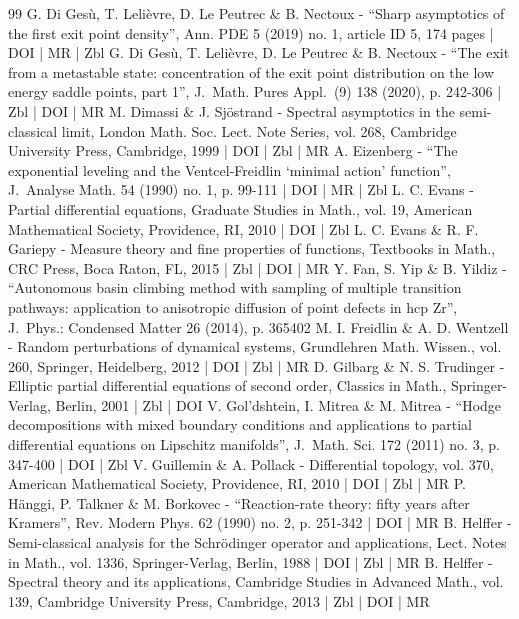 \begin{thebibliography}{99}
G. Di Gesù, T. Lelièvre, D. Le Peutrec \& B. Nectoux - “Sharp asymptotics of the first exit point density”, Ann. PDE 5 (2019) no. 1, article ID 5, 174 pages | DOI | MR | Zbl
G. Di Gesù, T. Lelièvre, D. Le Peutrec \& B. Nectoux - “The exit from a metastable state: concentration of the exit point distribution on the low energy saddle points, part 1”, J. Math. Pures Appl. (9) 138 (2020), p. 242-306 | Zbl | DOI | MR
M. Dimassi \& J. Sjöstrand - Spectral asymptotics in the semi-classical limit, London Math. Soc. Lect. Note Series, vol. 268, Cambridge University Press, Cambridge, 1999 | DOI | Zbl | MR
A. Eizenberg - “The exponential leveling and the Ventcel-Freidlin ‘minimal action’ function”, J. Analyse Math. 54 (1990) no. 1, p. 99-111 | DOI | MR | Zbl
L. C. Evans - Partial differential equations, Graduate Studies in Math., vol. 19, American Mathematical Society, Providence, RI, 2010 | DOI | Zbl
L. C. Evans \& R. F. Gariepy - Measure theory and fine properties of functions, Textbooks in Math., CRC Press, Boca Raton, FL, 2015 | Zbl | DOI | MR
Y. Fan, S. Yip \& B. Yildiz - “Autonomous basin climbing method with sampling of multiple transition pathways: application to anisotropic diffusion of point defects in hcp Zr”, J. Phys.: Condensed Matter 26 (2014), p. 365402
M. I. Freidlin \& A. D. Wentzell - Random perturbations of dynamical systems, Grundlehren Math. Wissen., vol. 260, Springer, Heidelberg, 2012 | DOI | Zbl | MR
D. Gilbarg \& N. S. Trudinger - Elliptic partial differential equations of second order, Classics in Math., Springer-Verlag, Berlin, 2001 | Zbl | DOI
V. Gol’dshtein, I. Mitrea \& M. Mitrea - “Hodge decompositions with mixed boundary conditions and applications to partial differential equations on Lipschitz manifolds”, J. Math. Sci. 172 (2011) no. 3, p. 347-400 | DOI | Zbl
V. Guillemin \& A. Pollack - Differential topology, vol. 370, American Mathematical Society, Providence, RI, 2010 | DOI | Zbl | MR
P. Hänggi, P. Talkner \& M. Borkovec - “Reaction-rate theory: fifty years after Kramers”, Rev. Modern Phys. 62 (1990) no. 2, p. 251-342 | DOI | MR
B. Helffer - Semi-classical analysis for the Schrödinger operator and applications, Lect. Notes in Math., vol. 1336, Springer-Verlag, Berlin, 1988 | DOI | Zbl | MR
B. Helffer - Spectral theory and its applications, Cambridge Studies in Advanced Math., vol. 139, Cambridge University Press, Cambridge, 2013 | Zbl | DOI | MR

\end{thebibliography}
